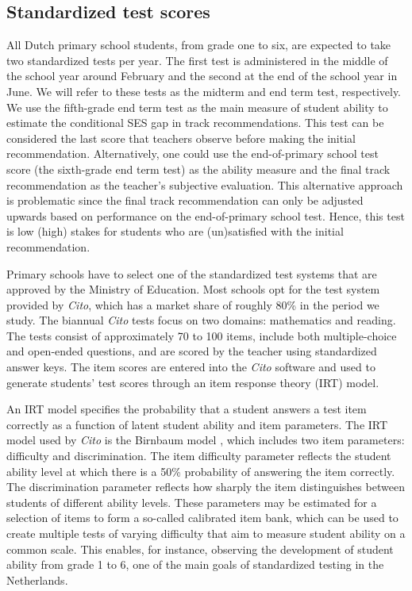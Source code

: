 \subsection{Standardized test scores}\label{sec:Testscores}

All Dutch primary school students, from grade one to six, are expected to take two standardized tests per year. The first test is administered in the middle of the school year around February and the second at the end of the school year in June. We will refer to these tests as the midterm and end term test, respectively. We use the fifth-grade end term test as the main measure of student ability to estimate the conditional SES gap in track recommendations. This test can be considered the last score that teachers observe before making the initial recommendation. Alternatively, one could use the end-of-primary school test score (the sixth-grade end term test) as the ability measure and the final track recommendation as the teacher's subjective evaluation. This alternative approach is problematic since the final track recommendation can only be adjusted upwards based on performance on the end-of-primary school test. Hence, this test is low (high) stakes for students who are (un)satisfied with the initial recommendation.

Primary schools have to select one of the standardized test systems that are approved by the Ministry of Education. Most schools opt for the test system provided by \textit{Cito}, which has a market share of roughly 80\% in the period we study. The biannual \textit{Cito} tests focus on two domains: mathematics and reading. The tests consist of approximately 70 to 100 items, include both multiple-choice and open-ended questions, and are scored by the teacher using standardized answer keys. The item scores are entered into the \textit{Cito} software and used to generate students' test scores through an item response theory (IRT) model. 

An IRT model specifies the probability that a student answers a test item correctly as a function of latent student ability and item parameters. The IRT model used by \textit{Cito} is the Birnbaum model \citep{Cito2017}, which includes two item parameters: difficulty and discrimination. The item difficulty parameter reflects the student ability level at which there is a 50\% probability of answering the item correctly. The discrimination parameter reflects how sharply the item distinguishes between students of different ability levels. These parameters may be estimated for a selection of items to form a so-called calibrated item bank, which can be used to create multiple tests of varying difficulty that aim to measure student ability on a common scale. This enables, for instance, observing the development of student ability from grade 1 to 6, one of the main goals of standardized testing in the Netherlands. 


